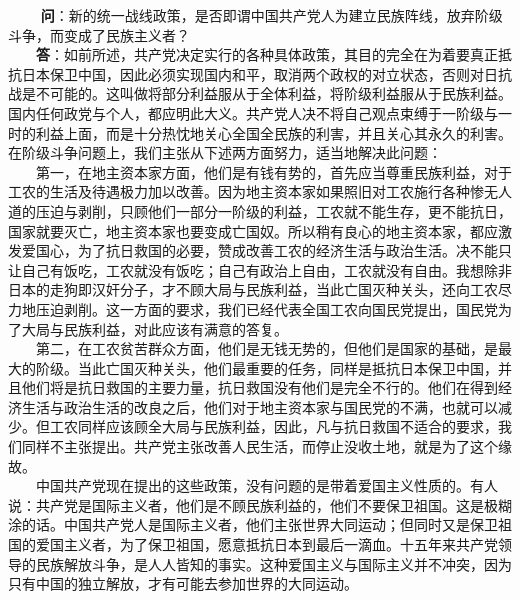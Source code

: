 \documentclass[cn,11pt,chinese]{elegantbook}
\begin{document}
　　
\textbf{问}：新的统一战线政策，是否即谓中国共产党人为建立民族阵线，放弃阶级斗争，而变成了民族主义者？\\
　　\textbf{答}：如前所述，共产党决定实行的各种具体政策，其目的完全在为着要真正抵抗日本保卫中国，因此必须实现国内和平，取消两个政权的对立状态，否则对日抗战是不可能的。这叫做将部分利益服从于全体利益，将阶级利益服从于民族利益。国内任何政党与个人，都应明此大义。共产党人决不将自己观点束缚于一阶级与一时的利益上面，而是十分热忱地关心全国全民族的利害，并且关心其永久的利害。在阶级斗争问题上，我们主张从下述两方面努力，适当地解决此问题：\\
　　第一，在地主资本家方面，他们是有钱有势的，首先应当尊重民族利益，对于工农的生活及待遇极力加以改善。因为地主资本家如果照旧对工农施行各种惨无人道的压迫与剥削，只顾他们一部分一阶级的利益，工农就不能生存，更不能抗日，国家就要灭亡，地主资本家也要变成亡国奴。所以稍有良心的地主资本家，都应激发爱国心，为了抗日救国的必要，赞成改善工农的经济生活与政治生活。决不能只让自己有饭吃，工农就没有饭吃；自己有政治上自由，工农就没有自由。我想除非日本的走狗即汉奸分子，才不顾大局与民族利益，当此亡国灭种关头，还向工农尽力地压迫剥削。这一方面的要求，我们已经代表全国工农向国民党提出，国民党为了大局与民族利益，对此应该有满意的答复。\\
　　第二，在工农贫苦群众方面，他们是无钱无势的，但他们是国家的基础，是最大的阶级。当此亡国灭种关头，他们最重要的任务，同样是抵抗日本保卫中国，并且他们将是抗日救国的主要力量，抗日救国没有他们是完全不行的。他们在得到经济生活与政治生活的改良之后，他们对于地主资本家与国民党的不满，也就可以减少。但工农同样应该顾全大局与民族利益，因此，凡与抗日救国不适合的要求，我们同样不主张提出。共产党主张改善人民生活，而停止没收土地，就是为了这个缘故。\\
　　中国共产党现在提出的这些政策，没有问题的是带着爱国主义性质的。有人说：共产党是国际主义者，他们是不顾民族利益的，他们不要保卫祖国。这是极糊涂的话。中国共产党人是国际主义者，他们主张世界大同运动；但同时又是保卫祖国的爱国主义者，为了保卫祖国，愿意抵抗日本到最后一滴血。十五年来共产党领导的民族解放斗争，是人人皆知的事实。这种爱国主义与国际主义并不冲突，因为只有中国的独立解放，才有可能去参加世界的大同运动。\\
\end{document}
